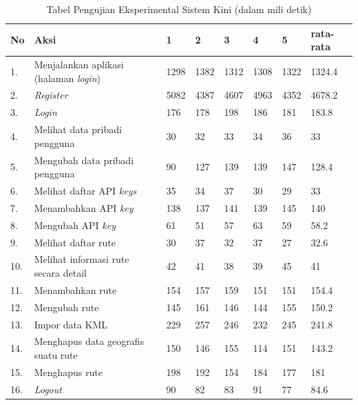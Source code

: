 \begin{table}[htbp]
	\centering
	\caption{Tabel Pengujian Eksperimental Sistem Kini (dalam mili detik)}
		\begin{tabular}{|p{0.37cm}| p{7cm}| p{1cm}| p{1cm}| p{1cm}| p{1cm}| p{1cm}| p{1cm}|} \hline
		No & Aksi & 1 & 2 & 3 & 4 & 5 & rata-rata \\ \hline
		1. & Menjalankan aplikasi (halaman \textit{login}) & 1298	&	1382	&	1312	&	1308	&	1322	&	1324.4 \\ \hline
 		2. & \textit{Register} & 5082	&	4387	&	4607	&	4963	&	4352	&	4678.2 \\ \hline
		3. & \textit{Login} & 176	&	178	&	198	&	186	&	181	&	183.8 \\ \hline
		4. & Melihat data pribadi pengguna & 30	&	32	&	33	&	34	&	36	&	33 \\ \hline
		5. & Mengubah data pribadi pengguna & 90	&	127	&	139	&	139	&	147	&	128.4 \\ \hline
		6. & Melihat daftar API \textit{keys} & 35	&	34	&	37	&	30	&	29	&	33 \\ \hline
		7. & Menambahkan API \textit{key} & 138	&	137	&	141	&	139	&	145	&	140 \\ \hline
		8. & Mengubah API \textit{key} & 61	&	51	&	57	&	63	&	59	&	58.2 \\ \hline
		9. & Melihat daftar rute & 30	&	37	&	32	&	37	&	27	&	32.6 \\ \hline
		10. & Melihat informasi rute secara detail & 42	&	41	&	38	&	39	&	45	&	41 \\ \hline
		11. & Menambahkan rute & 154	&	157	&	159	&	151	&	151	&	154.4 \\ \hline
		12. & Mengubah rute & 145	&	161	&	146	&	144	&	155	&	150.2 \\ \hline
		13. & Impor data KML & 229	&	257	&	246	&	232	&	245	&	241.8 \\ \hline
		14. & Menghapus data geografis suatu rute & 150	&	146	&	155	&	114	&	151	&	143.2 \\ \hline
		15. & Menghapus rute & 198	&	192	&	154	&	184	&	177	&	181 \\ \hline
		16. & \textit{Logout} & 90	&	82	&	83	&	91	&	77	&	84.6 \\ \hline
		\end{tabular}
	\label{table:hasileksperimental1}
\end{table}


